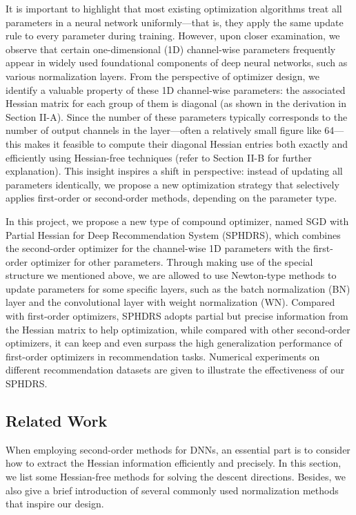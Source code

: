 \documentclass[conference]{IEEEtran}
\begin{document}
It is important to highlight that most existing optimization algorithms treat all parameters in a neural network uniformly—that is, they apply the same update rule to every parameter during training. However, upon closer examination, we observe that certain one-dimensional (1D) channel-wise parameters frequently appear in widely used foundational components of deep neural networks, such as various normalization layers. From the perspective of optimizer design, we identify a valuable property of these 1D channel-wise parameters: the associated Hessian matrix for each group of them is diagonal (as shown in the derivation in Section II-A). Since the number of these parameters typically corresponds to the number of output channels in the layer—often a relatively small figure like 64—this makes it feasible to compute their diagonal Hessian entries both exactly and efficiently using Hessian-free techniques (refer to Section II-B for further explanation). This insight inspires a shift in perspective: instead of updating all parameters identically, we propose a new optimization strategy that selectively applies first-order or second-order methods, depending on the parameter type.

In this project, we propose a new type of compound optimizer, named SGD with Partial Hessian for Deep Recommendation System (SPHDRS), which combines the second-order optimizer for the channel-wise 1D parameters with the first-order optimizer for other parameters. Through making use of the special structure we mentioned above, we are allowed to use Newton-type methods to update parameters for some specific layers, such as the batch normalization (BN) layer and the convolutional layer with weight normalization (WN). Compared with first-order optimizers, SPHDRS adopts partial but precise information from the Hessian matrix to help optimization, while compared with other second-order optimizers, it can keep and even surpass the high generalization performance of first-order optimizers in recommendation tasks. Numerical experiments on different recommendation datasets are given to illustrate the effectiveness of our SPHDRS.

\subsection{Related Work}

When employing second-order methods for DNNs, an essential part is to consider how to extract the Hessian information efficiently and precisely. In this section, we list some Hessian-free methods for solving the descent directions. Besides, we also give a brief introduction of several commonly used normalization methods that inspire our design.
\end{document}
